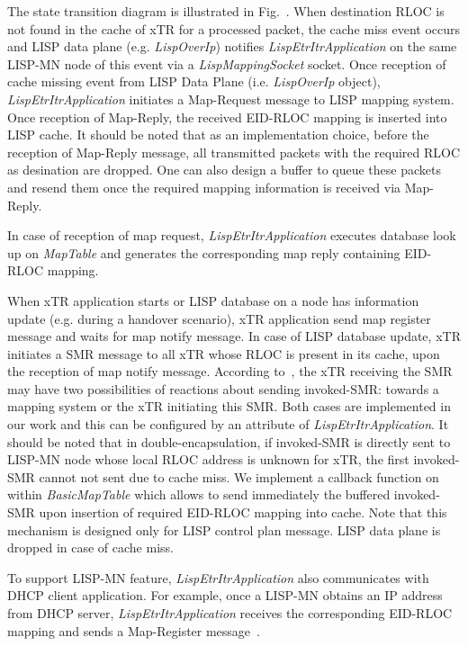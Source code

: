 The state transition diagram is illustrated in Fig.~{}. When destination RLOC is not found in the cache of xTR for a processed packet, the cache miss event occurs and LISP data plane (e.g. \emph{LispOverIp}) notifies \emph{LispEtrItrApplication} on the same LISP-MN node of this event via a \emph{LispMappingSocket} socket. Once reception of cache missing event from LISP Data Plane (i.e. \emph{LispOverIp} object), \emph{LispEtrItrApplication} initiates a Map-Request message to LISP mapping system. Once reception of Map-Reply, the received EID-RLOC mapping is inserted into LISP cache. 
It should be noted that as an implementation choice, before the reception of Map-Reply message, all transmitted packets with the required RLOC as desination are dropped. One can also design a buffer to queue these packets and resend them once the required mapping information is received via Map-Reply.

In case of reception of map request, \emph{LispEtrItrApplication} executes database look up on \emph{MapTable} and generates the corresponding map reply containing EID-RLOC mapping.

When xTR application starts or LISP database on a node has information update (e.g. during a handover scenario), xTR application send map register message and waits for map notify message. In case of LISP database update, xTR initiates a SMR message to all xTR whose RLOC is present in its cache, upon the reception of map notify message. According to~\cite{rfc6830}, the xTR receiving the SMR may have two possibilities of reactions about sending invoked-SMR:  towards a mapping system or the xTR initiating this SMR. Both cases are implemented in our work and this can be configured by an attribute of \emph{LispEtrItrApplication}. It should be noted that in double-encapsulation, if invoked-SMR is directly sent to LISP-MN node whose local RLOC address is unknown for xTR, the first invoked-SMR cannot not sent due to cache miss. We implement a callback function on within \emph{BasicMapTable} which allows to send immediately the buffered invoked-SMR upon insertion of required EID-RLOC mapping into cache. Note that this mechanism is designed only for LISP control plan message. LISP data plane is dropped in case of cache miss.

To support LISP-MN feature, \emph{LispEtrItrApplication} also communicates with DHCP client application. For example, once a LISP-MN obtains an IP address from DHCP server, \emph{LispEtrItrApplication} receives the corresponding EID-RLOC mapping and sends a Map-Register message~\cite{meyer-lisp-mn-16}.

